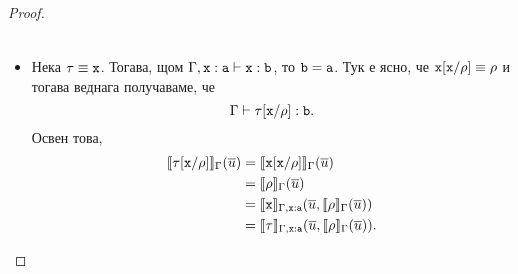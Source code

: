 \begin{proof}
\begin{itemize}
\begin{align*}
    \end{align*}
  \item
    Нека $\tau \equiv \texttt{x}$. Тогава, щом $\Gamma, \texttt{x}:\texttt{a} \vdash \texttt{x}:\texttt{b}$, то $\texttt{b} = \texttt{a}$.
    Тук е ясно, че $\texttt{x}[\texttt{x}/{\rho}] \equiv \rho$ и тогава веднага получаваме, че
    \[\Gamma \vdash \tau[\texttt{x}/{\rho}] : \texttt{b}.\]
    Освен това,
    \begin{align*}
      \llbracket{\tau[\texttt{x}/{\rho}]}\rrbracket_\Gamma(\overline{u}) & = \llbracket{\texttt{x}[\texttt{x}/{\rho}]}\rrbracket_\Gamma(\overline{u})\\
                                               & = \llbracket{\rho}\rrbracket_\Gamma(\overline{u})\\
                                               & = \llbracket{\texttt{x}}\rrbracket_{\Gamma,\texttt{x}:\texttt{a}}(\overline{u},\llbracket{\rho}\rrbracket_\Gamma(\overline{u}))\\
                                               & = \llbracket{\tau}\rrbracket_{\Gamma,\texttt{x}:\texttt{a}}(\overline{u},\llbracket{\rho}\rrbracket_\Gamma(\overline{u})).
    \end{align*}
  \end{itemize}


\end{proof}
